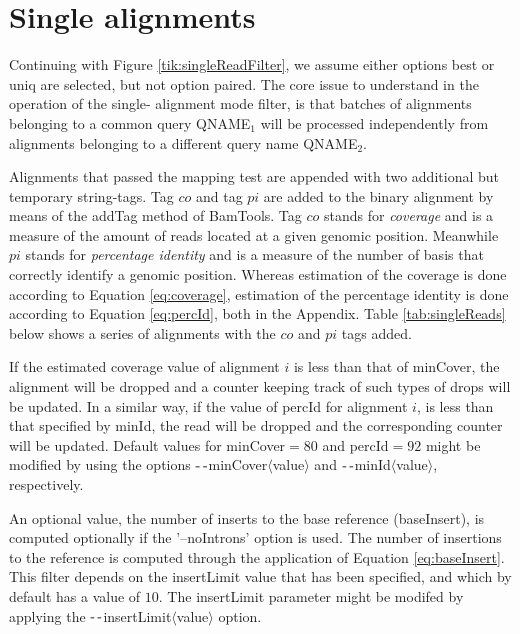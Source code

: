 \documentclass[11pt]{article}
\newcommand{\subscript}[1]{\ensuremath{_{\textrm{#1}}}}
\newcommand{\printOption}[1]{$\textrm{-\,-}${\fontfamily{phv}\selectfont#1}$\langle${\fontfamily{phv}\selectfont value}$\rangle$}
\newcommand{\setOption}[2]{{\fontfamily{phv}\selectfont#1}\ensuremath{=#2}}
\newcommand{\option}[1]{{\fontfamily{phv}\selectfont#1}}
\newcommand{\bamApi}[1]{{\fontfamily{bch}\selectfont#1}}
\begin{document}
{\section{Single alignments} \label{sec:singleAls}
Continuing with Figure \ref{tik:singleReadFilter}, we assume either options \option{best} or \option{uniq}  
are selected, but not option \option{paired}. The core issue to understand in the operation of the single-
alignment mode filter, is that batches of alignments belonging to a common query QNAME\subscript{1} will 
be processed independently from alignments belonging to a different query name QNAME\subscript{2}. 

Alignments that passed the mapping test are appended with two additional but temporary 
string-tags. Tag $co$ and tag $pi$ are added to the binary alignment by means of the \bamApi{addTag} method of 
BamTools. Tag $co$ stands for \emph{coverage} and is a measure of the amount of reads located at a given 
genomic position. Meanwhile $pi$ stands for \emph{percentage identity} and is a measure of the number of 
basis that correctly identify a genomic position. Whereas estimation of the coverage is done according to 
Equation \ref{eq:coverage}, estimation of the percentage identity is done according to Equation \ref{eq:percId}, both in the Appendix. Table \ref{tab:singleReads} below shows a series of alignments with the $co$ and 
$pi$ tags added.

 
If the estimated coverage value of alignment $i$ is less than that of \option{minCover}, the alignment 
will be dropped and a counter keeping track of such types of drops will be updated. In a similar way, if 
the value of \option{percId} for alignment $i$, is less than that specified by \option{minId}, the read 
will be dropped and the corresponding counter will be updated. Default values for \setOption{minCover}{80} 
and \setOption{percId}{92} might be modified by using the options \printOption{minCover} and 
\printOption{minId}, respectively.

An optional value, the number of inserts to the base reference (baseInsert), is computed optionally if 
the '--noIntrons' option is used. The number of insertions to the reference is computed through the 
application of Equation \ref{eq:baseInsert}. This filter depends on the insertLimit value that has been 
specified, and which by default has a value of $10$. The insertLimit parameter might be modifed by 
applying the \printOption{insertLimit} option.

}
\end{document}
